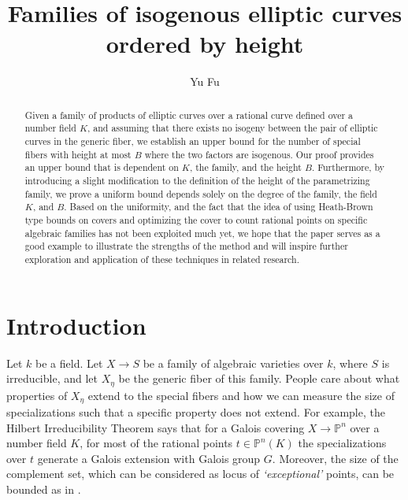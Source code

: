 \documentclass[12pt]{amsart}
\theoremstyle{definition}
\theoremstyle{remark}
\numberwithin{equation}{section}
\begin{document}
\title{Families of isogenous elliptic curves ordered by height}
\author{Yu Fu}


\maketitle
\begin{abstract}{
Given a family of products of elliptic curves over a rational curve defined over a number field $K$, and assuming that there exists no isogeny between the pair of elliptic curves in the generic fiber, we establish an upper bound for the number of special fibers with height at most $B$ where the two factors are isogenous. Our proof provides an upper bound that is dependent on $K$, the family, and the height $B$. Furthermore, by introducing a slight modification to the definition of the height of the parametrizing family, we prove a uniform bound depends solely on the degree of the family, the field $K$, and $B$. Based on the uniformity, and the fact that the idea of using Heath-Brown type bounds on covers and optimizing the cover to count rational points on specific algebraic families has not been exploited much yet, we hope that the paper serves as a good example to illustrate the strengths of the method and will inspire further exploration and application of these techniques in related research. }
\end{abstract}
\maketitle

\section{Introduction}

Let $k$ be a field. Let $X \to S$ be a family of algebraic varieties over $k$, where $S$ is irreducible, and let $X_{\eta}$ be the generic fiber of this family. People care about what properties of $X_{\eta}$ extend to the special fibers and how we can measure the size of specializations such that a specific property does not extend. For example, the Hilbert Irreducibility Theorem says that for a Galois covering $X \to \mathbb{P}^{n}$ over a number field $K$, for most of the rational points $t \in \mathbb{P}^{n}(K)$ the specializations over $t$ generate a Galois extension with Galois group $G$. Moreover, the size of the complement set, which can be considered as locus of \textit{`exceptional'} points, can be bounded as in \cite{Ser}.
\end{document}
